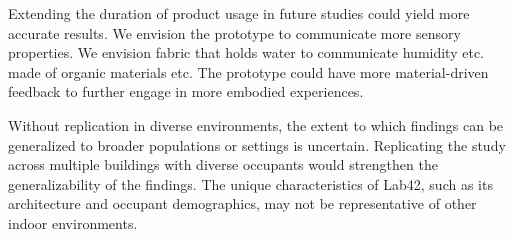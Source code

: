 Extending the duration of product usage in future studies could yield more accurate results. We envision the prototype to communicate more sensory properties. We envision fabric that holds water to communicate humidity etc. made of organic materials etc. The prototype could have more material-driven feedback to further engage in more embodied experiences.

Without replication in diverse environments, the extent to which findings can be generalized to broader populations or settings is uncertain. Replicating the study across multiple buildings with diverse occupants would strengthen the generalizability of the findings. The unique characteristics of Lab42, such as its architecture and occupant demographics, may not be representative of other indoor environments. 